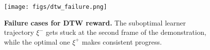 \begin{figure} %
    \centering    
    \texttt{[image: figs/dtw\_failure.png]}
    \caption{\small \textbf{Failure cases for DTW reward.} The suboptimal learner trajectory $\xi^-$ gets stuck at the second frame of the demonstration, while the optimal one $\xi^+$ makes consistent progress.}
    \label{fig:dtw_fail}
\end{figure}